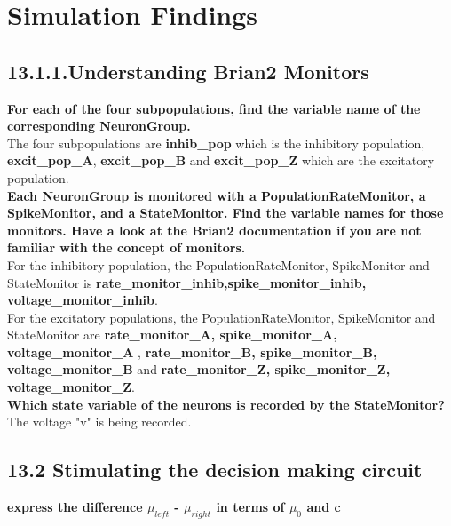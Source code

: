 \section*{Simulation Findings}

\subsection*{13.1.1.Understanding Brian2 Monitors}

\textbf{For each of the four subpopulations, find the variable name of the corresponding NeuronGroup.} \\

The four subpopulations are \textbf{inhib\_pop} which is the inhibitory population, \textbf{excit\_pop\_A}, \textbf{excit\_pop\_B} and \textbf{excit\_pop\_Z} which are the excitatory population. \\

\textbf{Each NeuronGroup is monitored with a PopulationRateMonitor, a SpikeMonitor, and a StateMonitor. Find the variable names for those monitors. Have a look at the Brian2 documentation if you are not familiar with the concept of monitors.}\\

For the inhibitory population, the PopulationRateMonitor, SpikeMonitor and StateMonitor is \textbf{rate\_monitor\_inhib,spike\_monitor\_inhib, voltage\_monitor\_inhib}.\\
For the excitatory populations, the PopulationRateMonitor, SpikeMonitor and StateMonitor are \textbf{rate\_monitor\_A, spike\_monitor\_A, voltage\_monitor\_A} ,  \textbf{rate\_monitor\_B, spike\_monitor\_B, voltage\_monitor\_B} and \textbf{rate\_monitor\_Z, spike\_monitor\_Z, voltage\_monitor\_Z}.\\

\textbf{Which state variable of the neurons is recorded by the StateMonitor?}\\

The voltage "v" is being recorded.

\subsection*{13.2 Stimulating the decision making circuit}

\textbf{express the difference $ \mu_{left} $ - $ \mu_{right} $ in terms of $ \mu_{0}$ and c}\\

